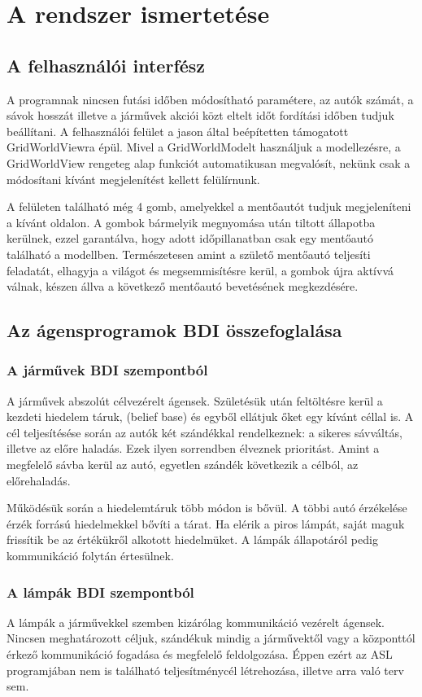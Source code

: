 \documentclass[a4paper, 11pt]{article}
\begin{document}
\section{A rendszer ismertetése}
\subsection{A felhasználói interfész}
A programnak nincsen futási időben módosítható paramétere, az autók számát, a sávok hosszát illetve a
járművek akciói közt eltelt időt fordítási időben tudjuk beállítani.
A felhasználói felület a jason által beépítetten támogatott GridWorldViewra épül. Mivel a GridWorldModelt
használjuk a modellezésre, a GridWorldView rengeteg alap funkciót automatikusan megvalósít, nekünk csak
a módosítani kívánt megjelenítést kellett felülírnunk.

A felületen található még 4 gomb, amelyekkel a mentőautót tudjuk megjeleníteni a kívánt oldalon. A gombok
bármelyik megnyomása után tiltott állapotba kerülnek, ezzel garantálva, hogy adott időpillanatban
csak egy mentőautó található a modellben. Természetesen amint a születő mentőautó teljesíti feladatát,
elhagyja a világot és megsemmisítésre kerül, a gombok újra aktívvá válnak, készen állva a következő
mentőautó bevetésének megkezdésére.
\subsection{Az ágensprogramok BDI összefoglalása}
\subsubsection{A járművek BDI szempontból}
A járművek abszolút célvezérelt ágensek. Születésük után feltöltésre kerül a kezdeti hiedelem táruk,
(belief base) és egyből ellátjuk őket egy kívánt céllal is. A cél teljesítésése során az autók két szándékkal
rendelkeznek: a sikeres sávváltás, illetve az előre haladás. Ezek ilyen sorrendben élveznek prioritást.
Amint a megfelelő sávba kerül az autó, egyetlen szándék következik a célból, az előrehaladás.

Működésük során a hiedelemtáruk több módon is bővül. A többi autó érzékelése érzék forrású hiedelmekkel
bővíti a tárat. Ha elérik a piros lámpát, saját maguk frissítik be az értékükről alkotott hiedelmüket.
A lámpák állapotáról pedig kommunikáció folytán értesülnek.

\subsubsection{A lámpák BDI szempontból}
A lámpák a járművekkel szemben kizárólag kommunikáció vezérelt ágensek. Nincsen meghatározott céljuk,
szándékuk mindig a járművektől vagy a központtól érkező kommunikáció fogadása és megfelelő feldolgozása.
Éppen ezért az ASL programjában nem is található teljesítménycél létrehozása, illetve arra való terv sem.
\end{document}
